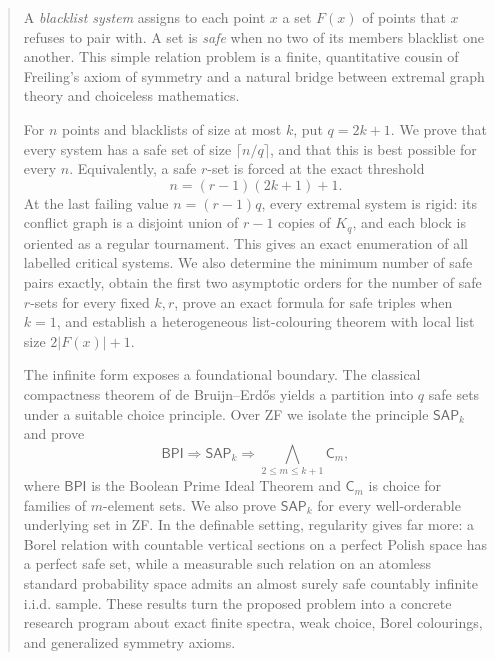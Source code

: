 \documentclass[11pt]{article}
\theoremstyle{definition}
\theoremstyle{remark}
\newcommand{\BPI}{\mathsf{BPI}}
\newcommand{\SAP}{\mathsf{SAP}}
\newcommand{\Cm}{\mathsf{C}}
\begin{document}
\begin{abstract}
A \emph{blacklist system} assigns to each point $x$ a set $F(x)$ of points
that $x$ refuses to pair with.  A set is \emph{safe} when no two of its
members blacklist one another.  This simple relation problem is a finite,
quantitative cousin of Freiling's axiom of symmetry and a natural bridge
between extremal graph theory and choiceless mathematics.

For $n$ points and blacklists of size at most $k$, put $q=2k+1$.  We prove
that every system has a safe set of size $\lceil n/q\rceil$, and that this is
best possible for every $n$.  Equivalently, a safe $r$-set is forced at the
exact threshold
\[
     n=(r-1)(2k+1)+1.
\]
At the last failing value $n=(r-1)q$, every extremal system is rigid: its
conflict graph is a disjoint union of $r-1$ copies of $K_q$, and each block is
oriented as a regular tournament.  This gives an exact enumeration of all
labelled critical systems.  We also determine the minimum number of safe
pairs exactly, obtain the first two asymptotic orders for the number of safe
$r$-sets for every fixed $k,r$, prove an exact formula for safe triples when
$k=1$, and establish a heterogeneous list-colouring theorem with local list
size $2\lvert F(x)\rvert+1$.

The infinite form exposes a foundational boundary.  The classical
compactness theorem of de Bruijn--Erd\H{o}s yields a partition into $q$ safe
sets under a suitable choice principle.  Over ZF we isolate the principle
$\SAP_k$ and prove
\[
   \BPI\Longrightarrow\SAP_k
   \Longrightarrow \bigwedge_{2\le m\le k+1}\Cm_m,
\]
where $\BPI$ is the Boolean Prime Ideal Theorem and $\Cm_m$ is choice for
families of $m$-element sets.  We also prove $\SAP_k$ for every well-orderable
underlying set in ZF.  In the definable setting, regularity gives far more:
a Borel relation with countable vertical sections on a perfect Polish space
has a perfect safe set, while a measurable such relation on an atomless
standard probability space admits an almost surely safe countably infinite
i.i.d. sample.  These results turn the proposed problem into a concrete
research program about exact finite spectra, weak choice, Borel colourings,
and generalized symmetry axioms.
\end{abstract}
\end{document}
